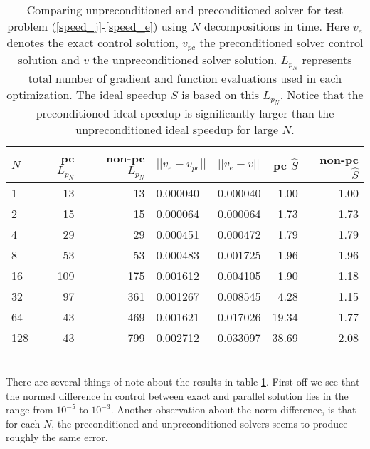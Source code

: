 \begin{table}[h]
\centering
\caption{Comparing unpreconditioned and preconditioned solver for test problem (\ref{speed_j}-\ref{speed_e}) using $N$ decompositions in time. Here $v_e$ denotes the exact control solution, $v_{pc}$ the preconditioned solver control solution and $v$ the unpreconditioned solver solution. $L_{p_N}$ represents total number of gradient and function evaluations used in each optimization. The ideal speedup $\hat S$ is based on this $L_{p_N}$. Notice that the preconditioned ideal speedup is significantly larger than the unpreconditioned ideal speedup for large $N$.}
\label{compare_table}
\begin{tabular}{lrrllrr}
\toprule
{}$N$ &  pc $L_{p_N}$ &  non-pc $L_{p_N}$ &       $||v_e-v_{pc}||$ &  $||v_e-v||$  &  pc $\hat{S}$ &  non-pc $\hat{S}$ \\
\midrule
1   &     13 &      13 &  0.000040 &    0.000040 &    1.00 &        1.00 \\
2   &     15 &      15 &  0.000064 &    0.000064 &    1.73 &        1.73 \\
4   &     29 &      29 &  0.000451 &    0.000472 &    1.79 &        1.79 \\
8   &     53 &      53 &  0.000483 &    0.001725 &    1.96 &        1.96 \\
16  &    109 &     175 &  0.001612 &    0.004105 &    1.90 &        1.18 \\
32  &     97 &     361 &  0.001267 &    0.008545 &    4.28 &        1.15 \\
64  &     43 &     469 &  0.001621 &    0.017026 &   19.34 &        1.77 \\
128 &     43 &     799 &  0.002712 &    0.033097 &   38.69 &        2.08 \\
\bottomrule
\end{tabular}
\end{table}
\\
There are several things of note about the results in table \ref{compare_table}. First off we see that the normed difference in control between exact and parallel solution lies in the range from $10^{-5}$ to $10^{-3}$. Another observation about the norm difference, is that for each $N$, the preconditioned and unpreconditioned solvers seems to produce roughly the same error. 
\\
\\
